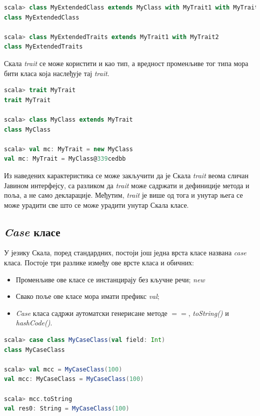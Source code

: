 \documentclass[12pt,oneside]{memoir}
\begin{document}
\begin{lstlisting}[language=Scala, caption={Наслеђивање више \textit{trait}-ова}, label={lst:scala_oop_extends_traits_with}]
scala> class MyExtendedClass extends MyClass with MyTrait1 with MyTrait2
class MyExtendedClass

scala> class MyExtendedTraits extends MyTrait1 with MyTrait2
class MyExtendedTraits
\end{lstlisting}

Скала \textit{trait} се може користити и као тип, а вредност променљиве тог типа мора бити класа која наслеђује тај \textit{trait}.

\begin{lstlisting}[language=Scala, caption={\textit{Trait} као тип}, label={lst:scala_oop_traits_types}]
scala> trait MyTrait
trait MyTrait

scala> class MyClass extends MyTrait
class MyClass

scala> val mc: MyTrait = new MyClass
val mc: MyTrait = MyClass@339cedbb
\end{lstlisting}

Из наведених карактеристика се може закључити да је Скала \textit{trait} веома сличан Јавином интерфејсу, са разликом да \textit{trait} може садржати и дефиниције метода и поља, а не само декларације. Међутим, \textit{trait} је више од тога и унутар њега се може урадити све што се може урадити унутар Скала класе.

\subsection{\textit{Case} класе}
\label{subsec:scala_case_klase}

У језику Скала, поред стандардних, постоји још једна врста класе названа \textit{case} класа. Постоје три разлике између ове врсте класа и обичних:

\begin{itemize} 
\item Променљиве ове класе се инстанцирају без кључне речи; \textit{new}
\item Свако поље ове класе мора имати префикс \textit{val};
\item \textit{Case} класа садржи аутоматски генерисане методе $==$, \textit{toString()} и \textit{hashCode()}.
\end{itemize}

\begin{lstlisting}[language=Scala, caption={Пример коришћења \textit{case} класа}, label={lst:scala_oop_case_class_example}]
scala> case class MyCaseClass(val field: Int)
class MyCaseClass

scala> val mcc = MyCaseClass(100)
val mcc: MyCaseClass = MyCaseClass(100)

scala> mcc.toString
val res0: String = MyCaseClass(100)
\end{lstlisting}
\end{document}
